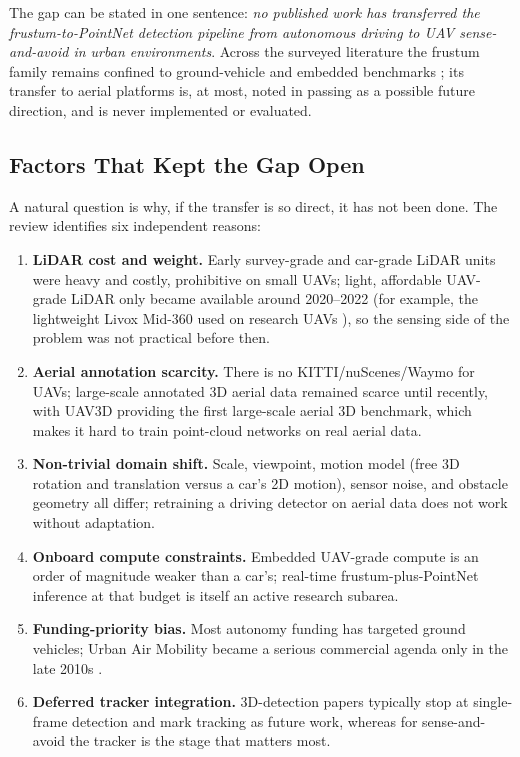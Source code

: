 The gap can be stated in one sentence: \emph{no published work has transferred
the frustum-to-PointNet detection pipeline from autonomous driving to UAV
sense-and-avoid in urban environments}. Across the surveyed literature the
frustum family remains confined to ground-vehicle and embedded benchmarks
\cite{qi2018frustum,wang2019fconvnet,paigwar2021fpp}; its transfer to aerial
platforms is, at most, noted in passing as a possible future direction, and is
never implemented or evaluated.

\subsection{Factors That Kept the Gap Open}

A natural question is why, if the transfer is so direct, it has not been done.
The review identifies six independent reasons:

\begin{enumerate}
  \item \textbf{LiDAR cost and weight.} Early survey-grade and car-grade LiDAR
  units were heavy and costly, prohibitive on small UAVs; light, affordable
  UAV-grade LiDAR only became available around 2020--2022 (for example, the
  lightweight Livox Mid-360 used on research UAVs \cite{livox_mid360}), so the
  sensing side of the problem was not practical before then.
  \item \textbf{Aerial annotation scarcity.} There is no KITTI/nuScenes/Waymo for
  UAVs; large-scale annotated 3D aerial data remained scarce until recently, with
  UAV3D \cite{ye2024uav3d} providing the first large-scale aerial 3D benchmark,
  which makes it hard to train point-cloud networks on real aerial data.
  \item \textbf{Non-trivial domain shift.} Scale, viewpoint, motion model (free
  3D rotation and translation versus a car's 2D motion), sensor noise, and
  obstacle geometry all differ; retraining a driving detector on aerial
  data does not work without adaptation.
  \item \textbf{Onboard compute constraints.} Embedded UAV-grade compute is
  an order of magnitude weaker than a car's; real-time frustum-plus-PointNet
  inference at that budget is itself an active research subarea.
  \item \textbf{Funding-priority bias.} Most autonomy funding has targeted ground
  vehicles; Urban Air Mobility became a serious commercial agenda only in the
  late 2010s \cite{straubinger2020uam}.
  \item \textbf{Deferred tracker integration.} 3D-detection papers typically stop
  at single-frame detection and mark tracking as future work, whereas for
  sense-and-avoid the tracker is the stage that matters most.
\end{enumerate}

